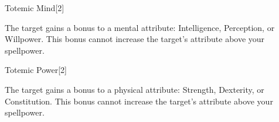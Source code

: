 \begin{spellsection}{Totemic Mind}[2]
    \begin{spellheader}
    \end{spellheader}
    \begin{spellcontent}
        \begin{spelltargetinginfo}
        \end{spelltargetinginfo}
        \begin{spelleffects}
            \spelleffect The target gains a  bonus to a mental attribute: Intelligence, Perception, or Willpower. This bonus cannot increase the target's attribute above your spellpower.
            \spelldur \durpersonallong
        \end{spelleffects}
    \end{spellcontent}
    \begin{spellfooter}
    \end{spellfooter}
    \begin{spellaugments}
    \end{spellaugments}
\end{spellsection}

\begin{spellsection}{Totemic Power}[2]
    \begin{spellheader}
    \end{spellheader}
    \begin{spellcontent}
        \begin{spelltargetinginfo}
        \end{spelltargetinginfo}
        \begin{spelleffects}
            \spelleffect The target gains a  bonus to a physical attribute: Strength, Dexterity, or Constitution. This bonus cannot increase the target's attribute above your spellpower.
            \spelldur \durpersonallong
        \end{spelleffects}
    \end{spellcontent}
    \begin{spellfooter}
    \end{spellfooter}
    \begin{spellaugments}
    \end{spellaugments}
\end{spellsection}

